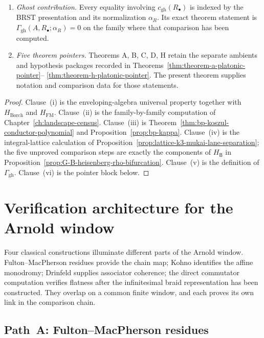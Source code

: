 \begin{theorem}
\begin{enumerate}[label=\textup{(\roman*)}]
\item \emph{Ghost contribution.}  Every equality involving
$c_{\mathrm{gh}}(R_\bullet)$ is indexed by the BRST presentation and
its normalization $\alpha_R$.  Its exact theorem statement is
$\Gamma_{\mathrm{gh}}(A,R_\bullet;\alpha_R)=0$ on the family where
that comparison has been computed.

\item \emph{Five theorem pointers.}  Theorems A, B, C, D, H retain
the separate ambients and hypothesis packages recorded in
Theorems~\ref{thm:theorem-a-platonic-pointer}--%
\ref{thm:theorem-h-platonic-pointer}.  The present theorem supplies
notation and comparison data for those statements.
\end{enumerate}
\end{theorem}

\begin{proof}
\label{prf:climax-vol1-platonic}
Clause~(i) is the enveloping-algebra universal property together with
$H_{\mathrm{Borch}}$ and $H_{\mathrm{FM}}$.  Clause~(ii) is the
family-by-family computation of
Chapter~\ref{ch:landscape-census}.  Clause~(iii) is
Theorem~\ref{thm:bp-koszul-conductor-polynomial} and
Proposition~\ref{prop:bp-kappa}.  Clause~(iv) is the integral-lattice
calculation of
Proposition~\ref{prop:lattice-k3-mukai-lane-separation}; the five
unproved comparison steps are exactly the components of
$H_{\mathsf B}$ in
Proposition~\ref{prop:G-B-heisenberg-rho-bifurcation}.  Clause~(v) is
the definition of $\Gamma_{\mathrm{gh}}$.  Clause~(vi) is the pointer
block below.
\end{proof}

\section{Verification architecture for the Arnold window}
\label{sec:climax-platonic-proof-architecture}

Four classical constructions illuminate different parts of the
Arnold window.  Fulton--MacPherson residues provide the chain map;
Kohno identifies the affine monodromy; Drinfeld supplies associator
coherence; the direct commutator computation verifies flatness after
the infinitesimal braid representation has been constructed.  They
overlap on a common finite window, and each proves its own link in
the comparison chain.

\subsection{Path~A: Fulton--MacPherson residues}
\label{ssec:climax-platonic-path-A-fm}

